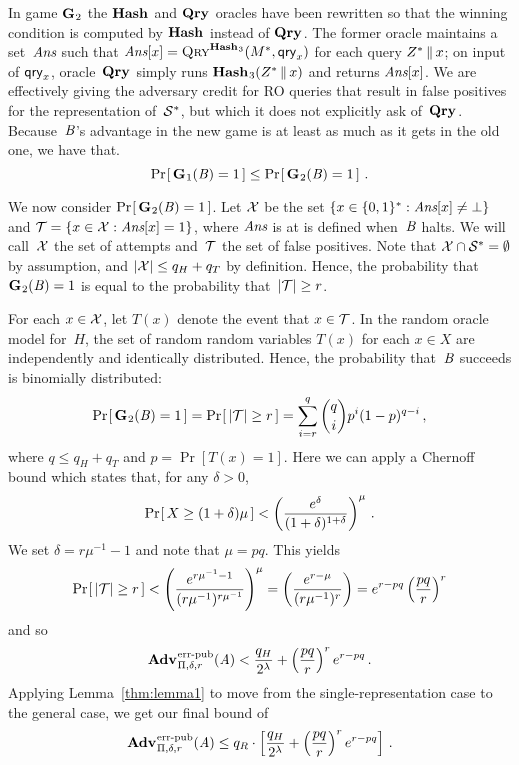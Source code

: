 In game $\textup{\textbf{G}}\hspace{0.5pt}_2$ the $\textup{\textbf{Hash}}\hspace{0.5pt}$ and $\textup{\textbf{Qry}}\hspace{0.5pt}$ oracles have been rewritten so that
the winning condition is computed by $\textup{\textbf{Hash}}\hspace{0.5pt}$ instead of $\textup{\textbf{Qry}}\hspace{0.5pt}$. The former
oracle maintains a set~$\textit{Ans}$ such that $\textit{Ans}[x] = \textnormal{\textsc{Qry}}^{\textup{\textbf{Hash}}\hspace{0.5pt}_3}(M^*, \mathsf{qry}_x)$ for
each query $Z^* \, \| \, x$; on input of $\mathsf{qry}_x$, oracle~$\textup{\textbf{Qry}}\hspace{0.5pt}$ simply runs
$\textup{\textbf{Hash}}\hspace{0.5pt}_3(Z^* \, \| \, x)$ and returns $\textit{Ans}[x]$.
%
We are effectively giving the adversary credit for RO queries that result in
false positives for the representation of~$\mathcal{S}^*$, but which it does not
explicitly ask of~$\textup{\textbf{Qry}}\hspace{0.5pt}$. Because~$\mathit{B}$'s advantage in the new game is at
least as much as it gets in the old one, we have that.
%
\begin{equation}
  \Pr\hspace{-1pt}\left[\,\textup{\textbf{G}}\hspace{0.5pt}_1(\mathit{B})=1\,\right] \leq \Pr\hspace{-1pt}\left[\,\textup{\textbf{G}}\hspace{0.5pt}_2(\mathit{B})=1\,\right] \,.
\end{equation}

We now consider $\Pr\hspace{-1pt}\left[\,\textup{\textbf{G}}\hspace{0.5pt}_2(\mathit{B})=1\,\right]$.
%
Let $\mathcal{X}$ be the set $\{ x \in \{0,1\}^* : \textit{Ans}[x] \ne \bot \}$ and $\mathcal{T} = \{x
\in\mathcal{X}: \textit{Ans}[x] = 1\}$, where $\textit{Ans}$ is at is defined when~$\mathit{B}$ halts. We
will call~$\mathcal{X}$ the set of attempts and~$\mathcal{T}$ the set of false positives.
%
Note that $\mathcal{X}\cap\mathcal{S}^*=\emptyset$ by assumption, and
$|\mathcal{X}| \leq q_H + q_T$ by definition.
%
Hence, the probability that~$\textup{\textbf{G}}\hspace{0.5pt}_2(\mathit{B})=1$ is equal to the probability
that~$|\mathcal{T}| \geq r$.

For each $x\in\mathcal{X}$, let $T(x)$ denote the event that $x\in\mathcal{T}$.
%
In the random oracle model for~$H$, the set of random random variables $T(x)$
for each $x\in X$ are independently and identically distributed.
%
Hence, the probability that~$\mathit{B}$ succeeds is binomially distributed:
%
\begin{equation}
   \Pr\hspace{-1pt}\left[\,\textup{\textbf{G}}\hspace{0.5pt}_2(\mathit{B})=1\,\right] = \Pr\hspace{-1pt}\left[\, |\mathcal{T}| \geq r \,\right] =
     \sum_{i=r}^{q} \binom{q}{i}p^i(1-p)^{q-i} \,,
\end{equation}
%
where $q \leq q_H + q_T$ and $p = \Pr[T(x)=1]$. Here we can apply a Chernoff
bound which states that, for any $\delta > 0$,
%
\begin{equation}
  \Pr\hspace{-1pt}\left[\,X \geq (1+\delta)\mu\,\right] < \left(\frac{e^\delta}{(1+\delta)^{1+\delta}}\right)^\mu
  \,.
\end{equation}
%
We set $\delta = r\mu^{-1}-1$ and note that $\mu = pq$.
This yields
%
\begin{equation}
 \Pr\hspace{-1pt}\left[\,|\mathcal{T}| \geq r\,\right] < \left(\frac{e^{r\mu^{-1}-1}}{(r\mu^{-1})^{r\mu^{-1}}}\right)^\mu = \left(\frac{e^{r-\mu}}{(r\mu^{-1})^r}\right) = e^{r-pq}\left(\frac{pq}{r}\right)^r
\end{equation}
%
and so
%
\begin{equation}
  \Adv{\errep}_{\Pi,\delta,r}(\advA) < \frac{q_H}{2^\lambda} + \left(\frac{pq}{r}\right)^re^{r-pq}
  \,.
\end{equation}
%
Applying Lemma~\ref{thm:lemma1} to move from the single-representation case to the
general case, we get our final bound of
\begin{equation}
  \Adv{\errep}_{\Pi,\delta,r}(\advA) \leq
    q_R \cdot \left[
      \frac{q_H}{2^\lambda} +
      \left(\frac{pq}{r}\right)^re^{r-pq}
    \right] \,.
\end{equation}
